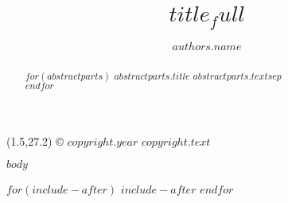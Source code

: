 \documentclass[twoside]{jchs}
\title{$title_full$}
\author[$authors.affiliation_ids$$if(authors.corresponding)$*$endif$]{$authors.name$} %
\affil[$affiliations.id$]{$affiliations.address$}
\begin{document}
\enlargethispage{-2\baselineskip}


\begin{abstract}
$for(abstractparts)$
{\bfseries $abstractparts.title$} $abstractparts.text$$sep$\\
$endfor$\\
\end{abstract}


\maketitle
\thispagestyle{empty} %


\setlength{\TPHorizModule}{10mm}
\setlength{\TPVertModule}{\TPHorizModule}
\textblockorigin{0mm}{0mm}

\begin{textblock}{18}(1.5,27.2)
\footnotesize{\noindent © $copyright.year$ $copyright.text$}
\end{textblock}







\begin{multicols}{2}
$body$
\end{multicols}

$for(include-after)$
$include-after$
$endfor$



%
% 
\end{document}
